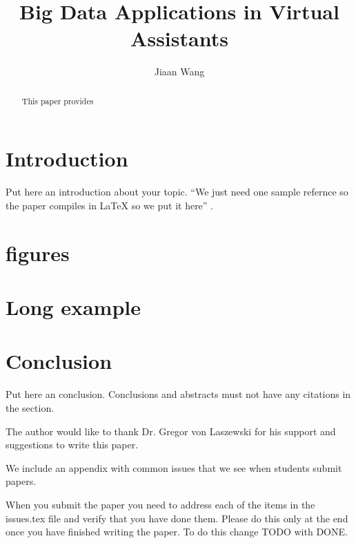 \title{Big Data Applications in Virtual Assistants}

\author{Jiaan Wang}

\begin{abstract}

    This paper provides
    
\end{abstract}


\maketitle

\section{Introduction}

Put here an introduction about your topic. 
``We just need one sample refernce so the paper compiles in LaTeX so we
put it here'' \cite{Tal2015internet} \cite{Waters2015life} \cite{Elgan2016future} \cite{Hard2014applications} \cite{Mueller2016analytics} \cite{Team2012data} \cite{Marvin2017them} \cite{Kinsbruner2017wants} \cite{Srivastava2016upswing} \cite{Boulton2016assistants} \cite{Simonite2016you} \cite{Etherington2014now} \cite{Baron2017assistants}.

\section{figures}

\section{Long example}

\section{Conclusion}

Put here an conclusion. Conclusions and abstracts must not have any
citations in the section.

\begin{acks}

  The author would like to thank Dr. Gregor von Laszewski for his
  support and suggestions to write this paper.

\end{acks}


 

\appendix

We include an appendix with common issues that we see when students
submit papers.

When you submit the paper you need to address each of the items in the
issues.tex file and verify that you have done them. Please do this
only at the end once you have finished writing the paper. To do this
change TODO with DONE. 
